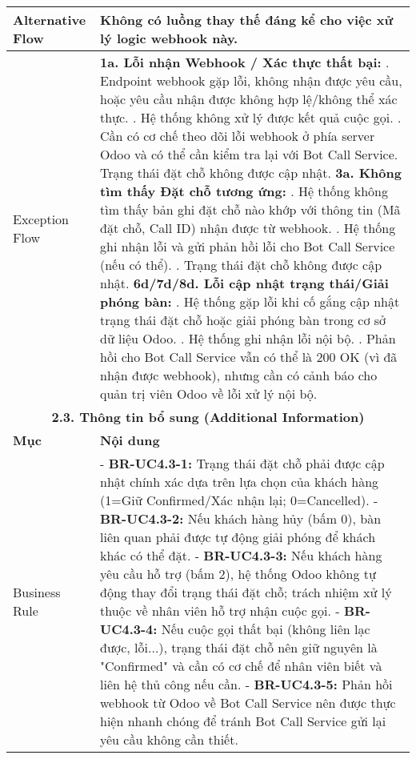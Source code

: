 \begin{longtable}{|m{4cm}|p{11cm}|}
\hline
Alternative Flow & Không có luồng thay thế đáng kể cho việc xử lý logic webhook này. \\
\hline
Exception Flow & \textbf{1a. Lỗi nhận Webhook / Xác thực thất bại:} \newline    1. Endpoint webhook gặp lỗi, không nhận được yêu cầu, hoặc yêu cầu nhận được không hợp lệ/không thể xác thực. \newline    2. Hệ thống không xử lý được kết quả cuộc gọi. \newline    3. Cần có cơ chế theo dõi lỗi webhook ở phía server Odoo và có thể cần kiểm tra lại với Bot Call Service. Trạng thái đặt chỗ không được cập nhật. \newline \textbf{3a. Không tìm thấy Đặt chỗ tương ứng:} \newline    1. Hệ thống không tìm thấy bản ghi đặt chỗ nào khớp với thông tin (Mã đặt chỗ, Call ID) nhận được từ webhook. \newline    2. Hệ thống ghi nhận lỗi và gửi phản hồi lỗi cho Bot Call Service (nếu có thể). \newline    3. Trạng thái đặt chỗ không được cập nhật. \newline \textbf{6d/7d/8d. Lỗi cập nhật trạng thái/Giải phóng bàn:} \newline    1. Hệ thống gặp lỗi khi cố gắng cập nhật trạng thái đặt chỗ hoặc giải phóng bàn trong cơ sở dữ liệu Odoo. \newline    2. Hệ thống ghi nhận lỗi nội bộ. \newline    3. Phản hồi cho Bot Call Service vẫn có thể là 200 OK (vì đã nhận được webhook), nhưng cần có cảnh báo cho quản trị viên Odoo về lỗi xử lý nội bộ. \\
\hline
\multicolumn{2}{|c|}{\textbf{2.3. Thông tin bổ sung (Additional Information)}} \\
\hline
\textbf{Mục} & \textbf{Nội dung} \\
\hline
Business Rule & - \textbf{BR-UC4.3-1:} Trạng thái đặt chỗ phải được cập nhật chính xác dựa trên lựa chọn của khách hàng (1=Giữ Confirmed/Xác nhận lại; 0=Cancelled). \newline - \textbf{BR-UC4.3-2:} Nếu khách hàng hủy (bấm 0), bàn liên quan phải được tự động giải phóng để khách khác có thể đặt. \newline - \textbf{BR-UC4.3-3:} Nếu khách hàng yêu cầu hỗ trợ (bấm 2), hệ thống Odoo không tự động thay đổi trạng thái đặt chỗ; trách nhiệm xử lý thuộc về nhân viên hỗ trợ nhận cuộc gọi. \newline - \textbf{BR-UC4.3-4:} Nếu cuộc gọi thất bại (không liên lạc được, lỗi...), trạng thái đặt chỗ nên giữ nguyên là "Confirmed" và cần có cơ chế để nhân viên biết và liên hệ thủ công nếu cần. \newline - \textbf{BR-UC4.3-5:} Phản hồi webhook từ Odoo về Bot Call Service nên được thực hiện nhanh chóng để tránh Bot Call Service gửi lại yêu cầu không cần thiết. \\

\end{longtable}
